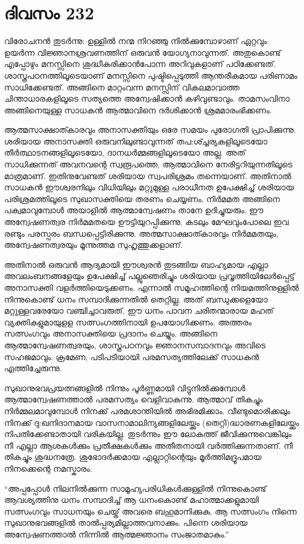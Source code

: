 \section{ദിവസം 232}


വിരോചനന്‍ തുടര്‍ന്നു: ഉള്ളില്‍ നന്മ നിറഞ്ഞു നില്‍ക്കുമ്പോഴാണ് ഏറ്റവും ഉയര്‍ന്ന വിജ്ഞാനശ്രവണത്തിന് ഒരുവന്‍ യോഗ്യനാവുന്നത്. അതുകൊണ്ട് എപ്പോഴും മനസ്സിനെ ശുദ്ധീകരിക്കാന്‍പോന്ന അറിവുകളാണ് പഠിക്കേണ്ടത്. ശാസ്ത്രപഠനത്തിലൂടെയാണ് മനസ്സിനെ പുഷ്ടിപ്പെടുത്തി ആന്തരീകമായ പരിണാമം സാധിക്കേണ്ടത്. അങ്ങിനെ മാറ്റംവന്ന മനസ്സിന് വികലമാവാത്ത ചിന്താധാരകളിലൂടെ സത്യത്തെ അന്വേഷിക്കാന്‍ കഴിവുണ്ടാവും. താമസംവിനാ അങ്ങിനെയുള്ള സാധകന്‍ ആത്മാവിനെ ദര്‍ശിക്കാന്‍ ശ്രമമാരംഭിക്കണം. 

ആത്മസാക്ഷാത്കാരവും അനാസക്തിയും ഒരേ സമയം പുരോഗതി പ്രാപിക്കുന്നു. ശരിയായ അനാസക്തി ഒരുവനിലുണ്ടാവുന്നത് തപ:ശ്ച്ചര്യകളിലൂടെയോ തീര്‍ത്ഥാടനങ്ങളിലൂടെയോ, ദാനധര്‍മ്മങ്ങളിലൂടെയോ  അല്ല. അത് സാധിക്കുന്നത് അവനവന്റെ സ്വരൂപത്തെ, ആത്മാവിനെ നേരിട്ടറിയുന്നതിലൂടെ മാത്രമാണ്.  ഇതിനുവേണ്ടത് ശരിയായ സ്വപരിശ്രമം തന്നെയാണ്. അതിനാല്‍ സാധകന്‍ ഈശ്വരനിലും വിധിയിലും മറ്റുമുള്ള പരാധീനത ഉപേക്ഷിച്ച് ശരിയായ പരിശ്രമത്തിലൂടെ സുഖാസക്തിയെ തരണം ചെയ്യണം. നിര്‍മമത അങ്ങിനെ പക്വമാവുമ്പോള്‍ അയാളില്‍ ആത്മാന്വേഷണം താനേ ഉദിച്ചുയരും. ഈ അന്വേഷണത്വര നിര്‍മമതയെ ഊട്ടിയുറപ്പിക്കുന്നു. കടലും മേഘവുംപോലെ ഇവ രണ്ടും പരസ്പരം ബന്ധപ്പെട്ടിരിക്കുന്നു. അത്മസാക്ഷാത്കാരവും നിര്‍മമതയും, അന്വേഷണത്വരയും മൂന്നുത്തമ സുഹൃത്തുക്കളാണ്.

അതിനാല്‍ ഒരുവന്‍ ആദ്യമായി ഈശ്വരന്‍ തുടങ്ങിയ ബാഹ്യമായ എല്ലാ അവലംബനങ്ങളേയും ഉപേക്ഷിച്ച് പല്ലുഞെരിച്ചും ശരിയായ പ്രവൃത്തിയിലേര്‍പ്പെട്ട് അനാസക്തി വളര്‍ത്തിയെടുക്കണം. എന്നാല്‍ സമൂഹത്തിന്റെ നിയമത്തിനുള്ളില്‍ നിന്നുകൊണ്ട് ധനം സമ്പാദിക്കുന്നതില്‍ തെറ്റില്ല. അത് ബന്ധുക്കളെയോ മറ്റുള്ളവരേയോ വഞ്ചിച്ചാവരുത്. ഈ ധനം പാവന ചരിതന്മാരായ മഹത് വ്യക്തികളുമായുളള സത്സംഗത്തിനായി ഉപയോഗിക്കണം. അത്തരം സത്സംഗവും  അനാസക്തിയെ പ്രദാനം ചെയ്യും. അങ്ങിനെ ആത്മാന്വേഷണത്വരയും, ശാസ്ത്രപഠനവും ജ്ഞാനസമ്പാദനവും അവിടെ സഹജമാവും. ക്രമേണ, പടിപടിയായി പരമസത്യത്തിലേക്ക് സാധകന്‍ എത്തിച്ചേരുന്നു.

സുഖാനുഭവപ്രയത്നങ്ങളില്‍ നിന്നും പൂര്‍ണ്ണമായി വിട്ടുനില്‍ക്കുമ്പോള്‍ ആത്മാന്വേഷണത്താല്‍ പരമസത്യം വെളിവാകുന്നു. ആത്മാവ് തികച്ചും  നിര്‍മ്മലമാവുമ്പോള്‍ നിനക്ക് പരമശാന്തിയില്‍ അഭിരമിക്കാം. വീണ്ടുമൊരിക്കലും നിനക്ക് ദു:ഖനിദാനമായ വാസനാമാലിന്യങ്ങളിലേയ്ക്കും (തെറ്റി)ദ്ധാരണകളിലേയ്ക്കും നിപതിക്കേണ്ടാതായി വരികയില്ല. തുടര്‍ന്നും ഈ ലോകത്ത് ജീവിക്കുന്നുവെങ്കിലും നീ എല്ലാ ആശകള്‍ക്കും പ്രതീക്ഷകള്‍ക്കും അതീതനായി വര്‍ത്തിക്കുന്നതാണ്. നീ തികച്ചും ശുദ്ധനത്രേ. ശുഭോദര്‍ക്കമായ എല്ലാറ്റിന്റെയും മൂര്‍ത്തിമദ്രൂപമായ നിനക്കെന്റെ നമസ്കാരം.

“അപ്പപ്പോള്‍ നിലനില്‍ക്കുന്ന സാമൂഹ്യപരിധികള്‍ക്കുള്ളില്‍ നിന്നുകൊണ്ട് ആവശ്യത്തിനു ധനം സമ്പാദിച്ച് ആ ധനംകൊണ്ട് മഹാത്മാക്കളുമായി സത്സംഗവും സാധനയും ചെയ്ത് അവരെ ബഹുമാനിക്കുക. ആ സത്സംഗം നിന്നെ സുഖാനുഭവങ്ങളില്‍ താല്‍പ്പര്യമില്ലാത്തവനാക്കും. പിന്നെ ശരിയായ അന്വേഷണത്താല്‍ നിന്നില്‍  ആത്മജ്ഞാനം സംജാതമാകും.”   
